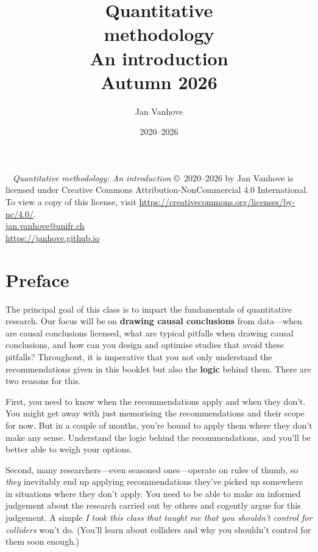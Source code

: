 \documentclass[a4paper]{tufte-book}\usepackage[]{graphicx}\usepackage[]{xcolor}
\title[Quantitative methodology]{{%
  \setlength{\parindent}{0pt}%
  Quantitative\\
  methodology\\%
  \vspace{1.8cm}%
  {\Huge An introduction}\\%
  \vspace{1.8cm}
  {\huge Autumn 2026}
}}
\date{2020--2026}
\author{Jan Vanhove}
\begin{document}
\frontmatter

\maketitle

\newpage
\begin{fullwidth}
~\vfill
\thispagestyle{empty}
\setlength{\parindent}{0pt}
\setlength{\parskip}{\baselineskip}
\textit{Quantitative methodology: An introduction} \copyright\ 2020--2026 by Jan Vanhove is licensed under Creative Commons Attribution-NonCommercial 4.0 International. \\
To view a copy of this license, visit \url{https://creativecommons.org/licenses/by-nc/4.0/}. \\
\url{jan.vanhove@unifr.ch} \\
\url{https://janhove.github.io}
\end{fullwidth}


\chapter{Preface}
The principal goal of this class is to impart the fundamentals of
quantitative research. Our focus will be on \textbf{drawing causal conclusions}
from data---when are causal conclusions licensed, what are typical pitfalls
when drawing causal conclusions,
and how can you design and optimise studies that avoid these pitfalls?
Throughout, it is imperative that you not only understand the recommendations
given in this booklet but also the \textbf{logic} behind them.
There are two reasons for this.

First, you need to know when the recommendations apply and when they don't.
You might get away with just memorising the recommendations and their scope
for now. But in a couple of months, you're bound to apply them where they don't make
any sense.
Understand the logic behind the recommendations, and you'll be better 
able to weigh your options.

Second, many researchers---even seasoned ones---operate
on rules of thumb, so \emph{they} inevitably end up applying recommendations they've 
picked up somewhere in situations where they don't apply. You need to be able
to make an informed judgement about the research carried out by others and
cogently argue for this judgement. A simple \textit{I took this class that taught
me that you shouldn't control for colliders} won't do.
(You'll learn about colliders and why you shouldn't control for them soon enough.)
\end{document}
